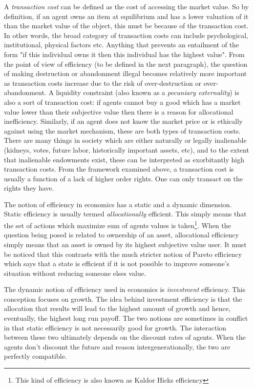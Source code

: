 A \textit{transaction cost} can be defined as the cost of accessing the market value. So by definition, if an agent owns an item at equilibrium and has a lower valuation of it than the market value of the object, this must be because of the transaction cost. In other words, the broad category of transaction costs can include psychological, institutional, physical factors etc. Anything that prevents an entailment of the form "if this individual owns it then this individual has the highest value". From the point of view of efficiency (to be defined in the next paragraph), the question of making destruction or abandonment illegal becomes relatively more important as transaction costs increase due to the risk of over-destruction or over-abandonment. A liquidity constraint (also known as a \textit{pecuniary externality}) is also a sort of transaction cost: if agents cannot buy a good which has a market value lower than their subjective value then there is a reason for allocational inefficiency. Similarly, if an agent does not know the market price or is ethically against using the market mechanism, these are both types of transaction costs. There are many things in society which are either naturally or legally inalienable (kidneys, votes, future labor, historically important assets, etc), and to the extent that inalienable endowments exist, these can be interpreted as exorbitantly high transaction costs. From the framework examined above, a transaction cost is usually a function of a lack of higher order rights. One can only transact on the rights they have.

The notion of efficiency in economics has a static and a dynamic dimension. Static efficiency is usually termed \textit{allocationally} efficient. This simply means that the set of actions which maximize sum of agents values is taken\footnote{This kind of efficiency is also known as Kaldor Hicks efficiency}. When the question being posed is related to ownership of an asset, allocational efficiency simply means that an asset is owned by its highest subjective value user. It must be noticed that this contrasts with the much stricter notion of Pareto efficiency which says that a state is efficient if it is not possible to improve someone's situation without reducing someone elses value. 

The dynamic notion of efficiency used in economics is \textit{investment} efficiency. This conception focuses on growth. The idea behind investment efficiency is that the allocation that results will lead to the highest amount of growth and hence, eventually, the highest long run payoff. The two notions are sometimes in conflict in that static efficiency is not necessarily good for growth. The interaction between these two ultimately depends on the discount rates of agents. When the agents don't discount the future and reason intergenerationally, the two are perfectly compatible.

